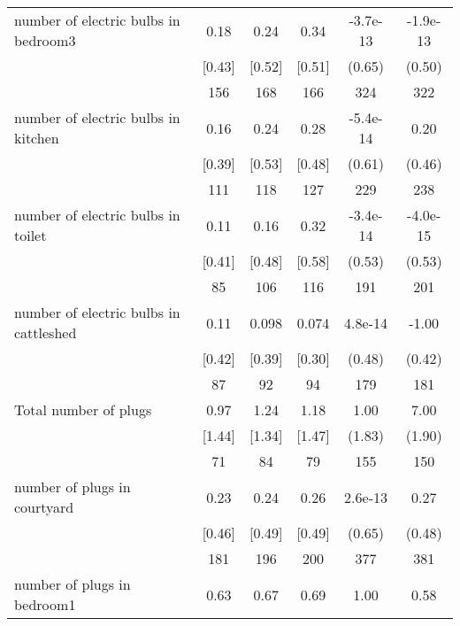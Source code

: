 \begin{table}[htbp]
\begin{tabular*}{0.9\hsize}{@{\hskip\tabcolsep\extracolsep\fill}l*{1}{ccccc}}
number of electric bulbs in bedroom3&     0.18&     0.24&     0.34& -3.7e-13         & -1.9e-13         \\
                                &   [0.43]&   [0.52]&   [0.51]&   (0.65)         &   (0.50)         \\
                                &      156&      168&      166&      324         &      322         \\
number of electric bulbs in kitchen&     0.16&     0.24&     0.28& -5.4e-14         &     0.20         \\
                                &   [0.39]&   [0.53]&   [0.48]&   (0.61)         &   (0.46)         \\
                                &      111&      118&      127&      229         &      238         \\
number of electric bulbs in toilet&     0.11&     0.16&     0.32& -3.4e-14         & -4.0e-15         \\
                                &   [0.41]&   [0.48]&   [0.58]&   (0.53)         &   (0.53)         \\
                                &       85&      106&      116&      191         &      201         \\
number of electric bulbs in cattleshed&     0.11&    0.098&    0.074&  4.8e-14         &    -1.00\sym{**} \\
                                &   [0.42]&   [0.39]&   [0.30]&   (0.48)         &   (0.42)         \\
                                &       87&       92&       94&      179         &      181         \\
Total number of plugs           &     0.97&     1.24&     1.18&     1.00         &     7.00\sym{***}\\
                                &   [1.44]&   [1.34]&   [1.47]&   (1.83)         &   (1.90)         \\
                                &       71&       84&       79&      155         &      150         \\
number of plugs in courtyard    &     0.23&     0.24&     0.26&  2.6e-13         &     0.27         \\
                                &   [0.46]&   [0.49]&   [0.49]&   (0.65)         &   (0.48)         \\
                                &      181&      196&      200&      377         &      381         \\
number of plugs in bedroom1     &     0.63&     0.67&     0.69&     1.00         &     0.58         \\

\end{tabular*}
\end{table}
